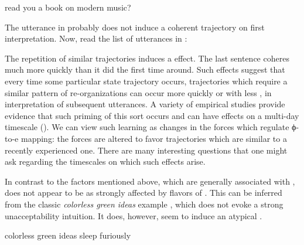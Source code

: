   \ea\label{ex:6:19}
    {read you a book on modern music?}
\z

The utterance in  probably does not induce a coherent trajectory on first interpretation. Now, read the list of utterances in :

\ea\label{ex:6:20}
\z
\z

  The repetition of similar trajectories induces a  effect. The last sentence coheres much more quickly than it did the first time around. Such effects suggest that every time some particular state trajectory occurs, trajectories which require a similar pattern of re-organizations can occur more quickly or with less , in interpretation of subsequent utterances. A variety of empirical studies provide evidence that such priming of this sort occurs and can have effects on a multi-day timescale (\citealt{BockEtAl2007,VSFerreiraEtAl2006,Nagata1988,Nagata1992,PickeringFerreira2008,RowlandEtAl2012}). We can view such learning as  changes in the forces which regulate ϕ-to-e mapping: the forces are altered to favor trajectories which are similar to a recently experienced one. There are many interesting questions that one might ask regarding the timescales on which such effects arise.

In contrast to the factors mentioned above, which are generally associated with ,  does not appear to be as strongly affected by flavors of . This can be inferred from the classic \textit{colorless green ideas} example \citep{Chomsky1956}, which does not evoke a strong unacceptability intuition. It does, however, seem to induce an atypical .
 
\ea
colorless green ideas sleep furiously
\z 

